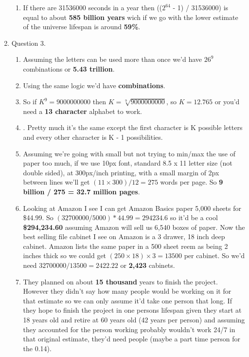 \documentclass{article}
\begin{document}
\begin{enumerate}
\begin{enumerate}
    \item If there are 31536000 seconds in a year then (($2^{64}$ - 1) / 31536000) is equal to about \textbf{585 billion years} wich if we go with the lower estimate of the universe lifespan is around \textbf{59\%}.
  \end{enumerate}

  \item Question 3. 
  \begin{enumerate}
    \item Assuming the letters can be used more than once we'd have $26^{9}$ combinations or \textbf{5.43 trillion}.
    \item Using the same logic we'd have  \textbf{combinations}.
    \item So if $K^{9} = 9000000000$ then $K = \sqrt[9]{9000000000}$, so $K = 12.765$ or you'd need a \textbf{13 character} alphabet to work.
    \item {}. Pretty much it's the same except the first character is K possible letters and every other character is K - 1 possibilities.
    \item Assuming we're going with small but not trying to min/max the use of paper too much, if we use 10px font, standard 8.5 x 11 letter size (not double sided), at 300px/inch printing, with a small margin of 2px between lines we'll get $(11\times 300) / 12 = 275$ words per page. So \textbf{9 billion / 275 = 32.7 million pages}.
    \item Looking at Amazon I see I can get Amazon Basics paper 5,000 sheets for \$44.99. So $(32700000 / 5000) * 44.99 = 294234.6$ so it'd be a cool \textbf{\$294,234.60} assuming Amazon will sell us 6,540 boxes of paper. Now the best selling file cabinet I see on Amazon is a 3 drawer, 18 inch deep cabinet. Amazon lists the same paper in a 500 sheet reem as being 2 inches thick so we could get $(250\times 18)\times 3 = 13500$ per cabinet. So we'd need $32700000 / 13500 = 2422.22$ or \textbf{2,423} cabinets.
    \item They planned on about \textbf{15 thousand} years to finish the project. However they didn't say how many people would be working on it for that estimate so we can only assume it'd take one person that long. If they hope to finish the project in one persons lifespan given they start at 18 years old and retire at 60 years old (42 years per person) and assuming they accounted for the person working probably wouldn't work 24/7 in that original estimate, they'd need  people (maybe a part time person for the 0.14).

\end{enumerate}
\end{enumerate}
\end{document}
